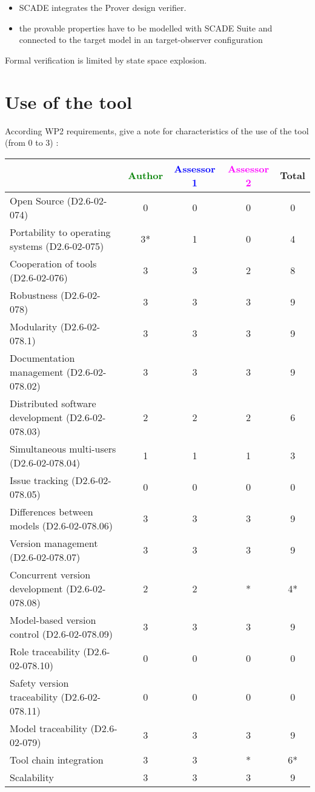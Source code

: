 \begin{itemize}
	\item SCADE integrates the Prover design verifier. 
	\item the provable properties have to be modelled with SCADE Suite and connected to the target model in an target-observer configuration
\end{itemize}


\begin{assessor1}
  Formal verification is limited by state space explosion.
\end{assessor1}

\section{Use of the tool}


According WP2 requirements, give a note for characteristics of the use of the tool (from 0 to 3) :

\begin{tabular}{|l | c | c | c | c|}
\hline
& \textcolor{green}{Author} & \textcolor{blue}{Assessor 1} & \textcolor{magenta}{Assessor 2} & Total \\
\hline 
Open Source (D2.6-02-074) &  0& 0 &0 & 0 \\
\hline 
Portability to operating systems (D2.6-02-075) &  3*&
1 &0 & 4 \\
\hline
Cooperation of tools (D2.6-02-076) &  3& 3 &2 & 8 \\
\hline
Robustness (D2.6-02-078) &  3& 3 &3 & 9 \\
\hline
Modularity (D2.6-02-078.1) &  3& 3 &3 & 9 \\
\hline
Documentation management (D2.6-02-078.02) &  3& 3 &3 & 9 \\
\hline
Distributed software development (D2.6-02-078.03)  &
2& 2 &2 & 6 \\
\hline
Simultaneous multi-users (D2.6-02-078.04)   &  1& 1 &1 & 3 \\
\hline
Issue tracking (D2.6-02-078.05) &  0&0 &0 & 0 \\
\hline
Differences between models (D2.6-02-078.06) &  3& 3 &3 & 9 \\
\hline
Version management (D2.6-02-078.07) &  3& 3 &3 & 9 \\
\hline
Concurrent version development (D2.6-02-078.08) &  2&
2& * & 4* \\
\hline
Model-based version control (D2.6-02-078.09) &  3& 3 &3 & 9 \\
\hline
Role traceability (D2.6-02-078.10) &  0& 0 &0 & 0 \\
\hline
Safety version traceability (D2.6-02-078.11) &  0& 0 &0 & 0 \\
\hline
Model traceability (D2.6-02-079) & 3 & 3 &3 & 9 \\
\hline
Tool chain integration & 3 & 3 &* & 6* \\
\hline
Scalability & 3 & 3 &3 & 9 \\
\hline
\end{tabular}


